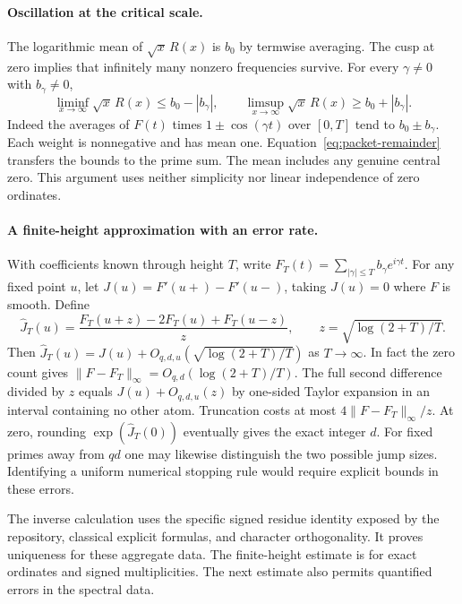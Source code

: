 \paragraph{Oscillation at the critical scale.}
The logarithmic mean of $\sqrt{x}\,R(x)$ is $b_0$ by termwise averaging.
The cusp at zero implies that infinitely many nonzero frequencies survive.
For every $\gamma\ne0$ with $b_\gamma\ne0$,
\[
 \liminf_{x\to\infty}\sqrt{x}\,R(x)\le b_0-|b_\gamma|,
 \qquad
 \limsup_{x\to\infty}\sqrt{x}\,R(x)\ge b_0+|b_\gamma|.
\]
Indeed the averages of $F(t)$ times $1\pm\cos(\gamma t)$ over $[0,T]$
tend to $b_0\pm b_\gamma$. Each weight is nonnegative and has mean one.
Equation~\eqref{eq:packet-remainder} transfers the bounds to the prime sum.
The mean includes any genuine central zero. This argument uses neither
simplicity nor linear independence of zero ordinates.

\paragraph{A finite-height approximation with an error rate.}
With coefficients known through height $T$, write $F_T(t)=\sum_{|\gamma|\le
T}b_\gamma e^{i\gamma t}$. For any fixed point $u$, let
$J(u)=F'(u+)-F'(u-)$, taking $J(u)=0$ where $F$ is smooth. Define
\[
 \widehat J_T(u)=
 \frac{F_T(u+z)-2F_T(u)+F_T(u-z)}{z},\qquad
 z=\sqrt{\log(2+T)/T}.
\]
Then $\widehat J_T(u)=J(u)+O_{q,d,u}(\sqrt{\log(2+T)/T})$ as
$T\to\infty$. In fact the zero count gives
$\lVert F-F_T\rVert_\infty=O_{q,d}(\log(2+T)/T)$. The full second
difference divided by $z$ equals $J(u)+O_{q,d,u}(z)$ by one-sided Taylor
expansion in an interval containing no other atom. Truncation costs at most
$4\lVert F-F_T\rVert_\infty/z$. At zero, rounding $\exp(\widehat J_T(0))$
eventually gives the exact integer $d$. For fixed primes away from $qd$
one may likewise distinguish the two possible jump sizes. Identifying a
uniform numerical stopping rule would require explicit bounds in these errors.

The inverse calculation uses the specific signed residue identity exposed by
the repository, classical explicit formulas, and character orthogonality.
It proves uniqueness for these aggregate data. The finite-height estimate is for exact ordinates and signed multiplicities.
The next estimate also permits quantified errors in the spectral data.
